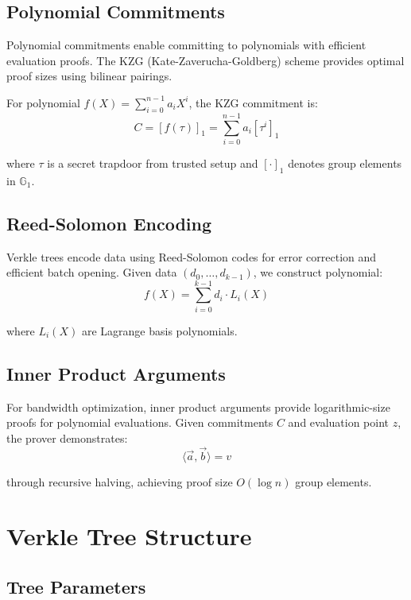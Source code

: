\documentclass[11pt,a4paper]{article}
\theoremstyle{definition}
\begin{document}
\subsection{Polynomial Commitments}

Polynomial commitments enable committing to polynomials with efficient evaluation proofs. The KZG (Kate-Zaverucha-Goldberg) scheme provides optimal proof sizes using bilinear pairings.

For polynomial $f(X) = \sum_{i=0}^{n-1} a_i X^i$, the KZG commitment is:
\begin{equation}
    C = [f(\tau)]_1 = \sum_{i=0}^{n-1} a_i[\tau^i]_1
\end{equation}

where $\tau$ is a secret trapdoor from trusted setup and $[\cdot]_1$ denotes group elements in $\mathbb{G}_1$.

\subsection{Reed-Solomon Encoding}

Verkle trees encode data using Reed-Solomon codes for error correction and efficient batch opening. Given data $(d_0, \ldots, d_{k-1})$, we construct polynomial:
\begin{equation}
    f(X) = \sum_{i=0}^{k-1} d_i \cdot L_i(X)
\end{equation}

where $L_i(X)$ are Lagrange basis polynomials.

\subsection{Inner Product Arguments}

For bandwidth optimization, inner product arguments provide logarithmic-size proofs for polynomial evaluations. Given commitments $C$ and evaluation point $z$, the prover demonstrates:
\begin{equation}
    \langle \vec{a}, \vec{b} \rangle = v
\end{equation}

through recursive halving, achieving proof size $O(\log n)$ group elements.

\section{Verkle Tree Structure}

\subsection{Tree Parameters}
\end{document}
